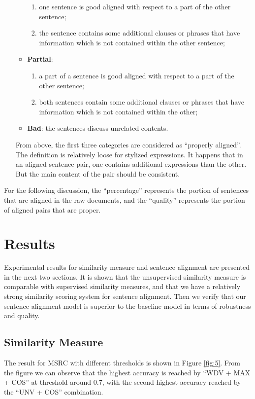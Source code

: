 \documentclass[runningheads]{llncs}
\begin{document}
\begin{spacing}{1.1}
\begin{enumerate}
\begin{itemize}
		\begin{enumerate}
			\item one sentence is good aligned with respect to a part of the other sentence;
			\item the sentence contains some additional clauses or phrases that have information which is not contained within the other sentence;
		\end{enumerate}
		\item \textbf{Partial}:
		\begin{enumerate}
			\item a part of a sentence is good aligned with respect to a part of the other sentence;
			\item both sentences contain some additional clauses or phrases that have information which is not contained within the other;
		\end{enumerate}
		\item \textbf{Bad}: the sentences discuss unrelated contents.
	\end{itemize}
	From above, the first three categories are considered as ``properly aligned''. The definition is relatively loose for stylized expressions. It happens that in an aligned sentence pair, one contains additional expressions than the other. But the main content of the pair should be consistent.
\end{enumerate}

For the following discussion, the ``percentage'' represents the portion of sentences that are aligned in the raw documents, and the ``quality'' represents the portion of aligned pairs that are proper.

\section{Results}
\label{sec:results}

Experimental results for similarity measure and sentence alignment are presented in the next two sections. It is shown that the unsupervised similarity measure is comparable with supervised similarity measures, and that we have a relatively strong similarity scoring system for sentence alignment. Then we verify that our sentence alignment model is superior to the baseline model in terms of robustness and quality.

\subsection{Similarity Measure}
The result for MSRC with different thresholds is shown in Figure \ref{fig:5}. From the figure we can observe that the highest accuracy is reached by ``WDV + MAX + COS'' at threshold around 0.7, with the second highest accuracy reached by the ``UNV + COS'' combination.


\end{spacing}
\end{document}
